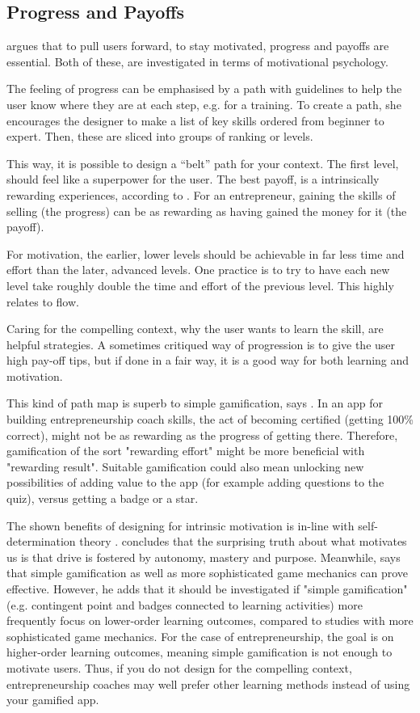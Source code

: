 \subsection{Progress and Payoffs} \label{progress-payoffs}

\cite{sierra} argues that to pull users forward, to stay motivated, progress and payoffs are essential. Both of these, are investigated in terms of motivational psychology.

The feeling of progress can be emphasised by a path with guidelines to help the user know where they are at each step, e.g. for a training. To create a path, she encourages the designer to make a list of key skills ordered from beginner to expert. Then, these are sliced into groups of ranking or levels.

This way, it is possible to design a “belt” path for your context. The first level, should feel like a superpower for the user. The best payoff, is a intrinsically rewarding experiences, according to \cite{sierra}. For an entrepreneur, gaining the skills of selling (the progress) can be as rewarding as having gained the money for it (the payoff).

For motivation, the earlier, lower levels should be achievable in far less time and effort than the later, advanced levels. One practice is to try to have each new level take roughly double the time and effort of the previous level. This highly relates to flow.

Caring for the compelling context, why the user wants to learn the skill, are helpful strategies. A sometimes critiqued way of progression is to give the user high pay-off tips, but if done in a fair way, it is a good way for both learning and motivation.

This kind of path map is superb to simple gamification, says \cite{sierra}. In an app for building entrepreneurship coach skills, the act of becoming certified (getting 100\% correct), might not be as rewarding as the progress of getting there. Therefore, gamification of the sort "rewarding effort" might be more beneficial with "rewarding result". Suitable gamification could also mean unlocking new possibilities of adding value to the app (for example adding questions to the quiz), versus getting a badge or a star.

The shown benefits of designing for intrinsic motivation is in-line with self-determination theory \citep{deci, ryan}.  \cite{pink} concludes that the surprising truth about what motivates us is that drive is fostered by autonomy, mastery and purpose. Meanwhile, \cite{gates} says that simple gamification as well as more sophisticated game mechanics can prove effective. However, he adds that it should be investigated if "simple gamification" (e.g. contingent point and badges connected to learning activities) more frequently focus on lower-order learning outcomes, compared to studies with more sophisticated game mechanics. For the case of entrepreneurship, the goal is on higher-order learning outcomes, meaning simple gamification is not enough to motivate users. Thus, if you do not design for the compelling context, entrepreneurship coaches may well prefer other learning methods instead of using your gamified app.
